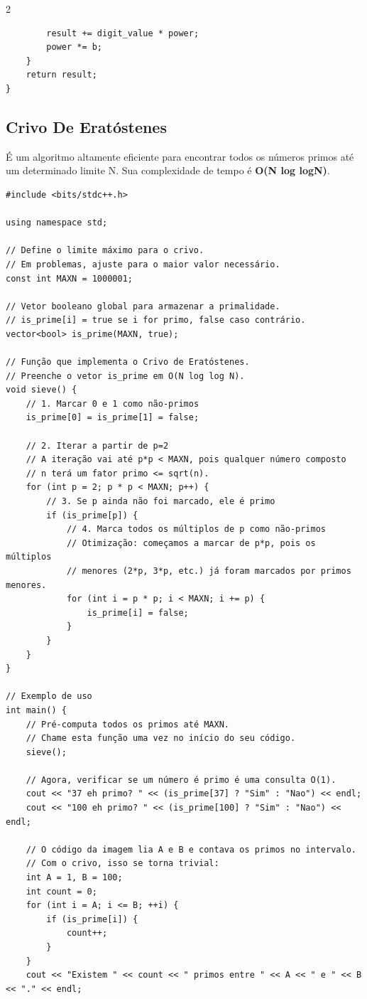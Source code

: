\documentclass[11pt]{article}
\begin{document}
\begin{multicols}{2}
\begin{lstlisting}
        result += digit_value * power;
        power *= b;
    }
    return result;
}
\end{lstlisting}

\subsection{Crivo De Eratóstenes}
É um algoritmo altamente eficiente para encontrar todos os números primos até um determinado limite N. Sua complexidade de tempo é \textbf{O(N log logN)}.
\begin{lstlisting}
#include <bits/stdc++.h>

using namespace std;

// Define o limite máximo para o crivo.
// Em problemas, ajuste para o maior valor necessário.
const int MAXN = 1000001; 

// Vetor booleano global para armazenar a primalidade.
// is_prime[i] = true se i for primo, false caso contrário.
vector<bool> is_prime(MAXN, true);

// Função que implementa o Crivo de Eratóstenes.
// Preenche o vetor is_prime em O(N log log N).
void sieve() {
    // 1. Marcar 0 e 1 como não-primos
    is_prime[0] = is_prime[1] = false;

    // 2. Iterar a partir de p=2
    // A iteração vai até p*p < MAXN, pois qualquer número composto
    // n terá um fator primo <= sqrt(n).
    for (int p = 2; p * p < MAXN; p++) {
        // 3. Se p ainda não foi marcado, ele é primo
        if (is_prime[p]) {
            // 4. Marca todos os múltiplos de p como não-primos
            // Otimização: começamos a marcar de p*p, pois os múltiplos
            // menores (2*p, 3*p, etc.) já foram marcados por primos menores.
            for (int i = p * p; i < MAXN; i += p) {
                is_prime[i] = false;
            }
        }
    }
}

// Exemplo de uso
int main() {
    // Pré-computa todos os primos até MAXN.
    // Chame esta função uma vez no início do seu código.
    sieve();

    // Agora, verificar se um número é primo é uma consulta O(1).
    cout << "37 eh primo? " << (is_prime[37] ? "Sim" : "Nao") << endl;
    cout << "100 eh primo? " << (is_prime[100] ? "Sim" : "Nao") << endl;

    // O código da imagem lia A e B e contava os primos no intervalo.
    // Com o crivo, isso se torna trivial:
    int A = 1, B = 100;
    int count = 0;
    for (int i = A; i <= B; ++i) {
        if (is_prime[i]) {
            count++;
        }
    }
    cout << "Existem " << count << " primos entre " << A << " e " << B << "." << endl;


\end{lstlisting}
\end{multicols}
\end{document}
